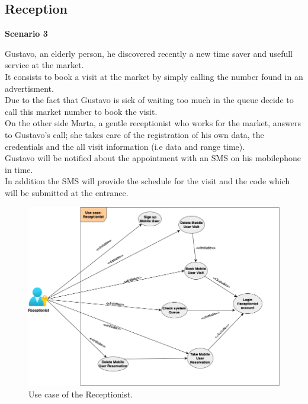 \pagebreak

\subsection{Reception}
\par \medskip
{\normalsize \textbf{Scenario 3}}
\par \medskip
 Gustavo, an elderly person, he discovered recently a new time saver and usefull service at the market. \\
 It consists to book a visit at the market by simply calling the number found in an advertisment. \\
 Due to the fact that Gustavo is sick of waiting too much in the queue decide to call this market number to book the visit. \\
 On the other side Marta, a gentle receptionist who works for the market, answers to Gustavo's call; she takes care of the registration of his own data, the credentials and the all visit information (i.e data and range time).\\
Gustavo will be notified about the appointment with an SMS on his mobilephone in time. \\
In addition the SMS will provide the schedule for the visit and the code which will be submitted at the entrance.
 
\bigbreak

 
 
 \begin{figure}[H]
 	\caption{Use case of the Receptionist.}
 	
 	\centering
 	\includegraphics[scale = 0.40]{diagrams/UseCaseReception.png}
 	
 \end{figure}

